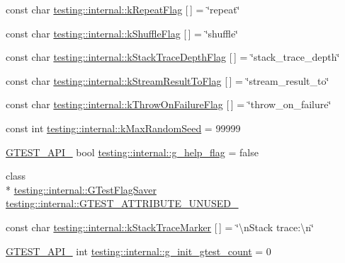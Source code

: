 \begin{DoxyCompactItemize}
\item 
const char \hyperlink{namespacetesting_1_1internal_a3e61db2ed34f0c3f0bc75745ea4803bf}{testing\-::internal\-::k\-Repeat\-Flag} \mbox{[}$\,$\mbox{]} = \char`\"{}repeat\char`\"{}
\item 
const char \hyperlink{namespacetesting_1_1internal_adcad7638dc48dd85e3f450f111213951}{testing\-::internal\-::k\-Shuffle\-Flag} \mbox{[}$\,$\mbox{]} = \char`\"{}shuffle\char`\"{}
\item 
const char \hyperlink{namespacetesting_1_1internal_aa3b00898fa2231d4e19ad0b1411c6261}{testing\-::internal\-::k\-Stack\-Trace\-Depth\-Flag} \mbox{[}$\,$\mbox{]} = \char`\"{}stack\-\_\-trace\-\_\-depth\char`\"{}
\item 
const char \hyperlink{namespacetesting_1_1internal_aaca973772e7b80fb0e1413855d9aad8d}{testing\-::internal\-::k\-Stream\-Result\-To\-Flag} \mbox{[}$\,$\mbox{]} = \char`\"{}stream\-\_\-result\-\_\-to\char`\"{}
\item 
const char \hyperlink{namespacetesting_1_1internal_ab457c8178b128b850fbb9f55b2bf1e5b}{testing\-::internal\-::k\-Throw\-On\-Failure\-Flag} \mbox{[}$\,$\mbox{]} = \char`\"{}throw\-\_\-on\-\_\-failure\char`\"{}
\item 
const int \hyperlink{namespacetesting_1_1internal_a41bd421ace53d23dbe85d9618c3afaee}{testing\-::internal\-::k\-Max\-Random\-Seed} = 99999
\item 
\hyperlink{gtest-port_8h_aa73be6f0ba4a7456180a94904ce17790}{G\-T\-E\-S\-T\-\_\-\-A\-P\-I\-\_\-} bool \hyperlink{namespacetesting_1_1internal_a93a772f5e51973b105d91cbb66a203f4}{testing\-::internal\-::g\-\_\-help\-\_\-flag} = false
\item 
class \\*
\hyperlink{classtesting_1_1internal_1_1_g_test_flag_saver}{testing\-::internal\-::\-G\-Test\-Flag\-Saver} \hyperlink{namespacetesting_1_1internal_a581ac897511489c75a06aa328dcfb62f}{testing\-::internal\-::\-G\-T\-E\-S\-T\-\_\-\-A\-T\-T\-R\-I\-B\-U\-T\-E\-\_\-\-U\-N\-U\-S\-E\-D\-\_\-}
\item 
const char \hyperlink{namespacetesting_1_1internal_abb38528ca6a45df265b19f5ccb3d16d9}{testing\-::internal\-::k\-Stack\-Trace\-Marker} \mbox{[}$\,$\mbox{]} = \char`\"{}\textbackslash{}n\-Stack trace\-:\textbackslash{}n\char`\"{}
\item 
\hyperlink{gtest-port_8h_aa73be6f0ba4a7456180a94904ce17790}{G\-T\-E\-S\-T\-\_\-\-A\-P\-I\-\_\-} int \hyperlink{namespacetesting_1_1internal_ac2e10dd08851d714ed2cc52e0b0d72b9}{testing\-::internal\-::g\-\_\-init\-\_\-gtest\-\_\-count} = 0

\end{DoxyCompactItemize}
